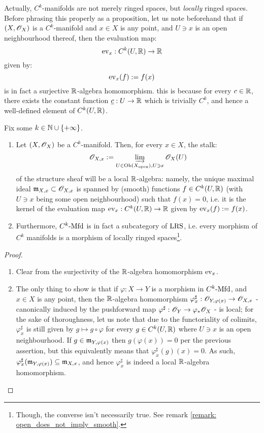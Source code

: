         Actually, $C^k$-manifolds are not merely ringed spaces, but \textit{locally} ringed spaces. Before phrasing this properly as a proposition, let us note beforehand that if $(X, \mathscr{O}_X)$ is a $C^k$-manifold and $x \in X$ is any point, and $U \ni x$ is an open neighbourhood thereof, then the evaluation map:
            $$\mathrm{ev}_x: C^k(U, \mathbb{R}) \to \mathbb{R}$$
        given by:
            $$\mathrm{ev}_x(f) := f(x)$$
        is in fact a surjective $\mathbb{R}$-algebra homomorphism. this is because for every $c \in \mathbb{R}$, there exists the constant function $\underline{c}: U \to \mathbb{R}$ which is trivially $C^k$, and hence a well-defined element of $C^k(U, \mathbb{R})$. 
        \begin{proposition} \label{prop: differentiable_manifolds_are_locally_ringed_spaces}
            Fix some $k \in \mathbb{N} \cup \{+\infty\}$.
            \begin{enumerate}
                \item Let $(X, \mathscr{O}_X)$ be a $C^k$-manifold. Then, for every $x \in X$, the stalk:
                    $$\mathscr{O}_{X, x} := \varinjlim_{U \in \mathrm{Ob}(X_{\mathrm{open}}), U \ni x} \mathscr{O}_X(U)$$
                of the structure sheaf will be a local $\mathbb{R}$-algebra: namely, the unique maximal ideal $\mathfrak{m}_{X, x} \subset \mathscr{O}_{X, x}$ is spanned by (smooth) functions $f \in C^k(U, \mathbb{R})$ (with $U \ni x$ being some open neighbourhood) such that $f(x) = 0$, i.e. it is the kernel of the evaluation map $\mathrm{ev}_x: C^k(U, \mathbb{R}) \to \mathbb{R}$ given by $\mathrm{ev}_x(f) := f(x)$. 
                \item Furthermore, $C^k\text{-}\mathrm{Mfd}$ is in fact a subcategory of $\mathrm{LRS}$, i.e. every morphism of $C^k$ manifolds is a morphism of locally ringed spaces\footnote{Though, the converse isn't necessarily true. See remark \ref{remark: open_does_not_imply_smooth}.}.
            \end{enumerate}
        \end{proposition}
            \begin{proof}
                \begin{enumerate}
                    \item Clear from the surjectivity of the $\mathbb{R}$-algebra homomorphism $\mathrm{ev}_x$.
                    \item The only thing to show is that if $\varphi: X \to Y$ is a morphism in $C^k\text{-}\mathrm{Mfd}$, and $x \in X$ is any point, then the $\mathbb{R}$-algebra homomorphism $\varphi^{\sharp}_x: \mathscr{O}_{Y, \varphi(x)} \to \mathscr{O}_{X, x}$ - canonically induced by the pushforward map $\varphi^{\sharp}: \mathscr{O}_Y \to \varphi_* \mathscr{O}_X$ - is local; for the sake of thoroughness, let us note that due to the functoriality of colimits, $\varphi^{\sharp}_x$ is still given by $g \mapsto g \circ \varphi$ for every $g \in C^k(U, \mathbb{R})$ where $U \ni x$ is an open neighbourhood. If $g \in \mathfrak{m}_{Y, \varphi(x)}$ then $g(\varphi(x)) = 0$ per the previous assertion, but this equivalently means that $\varphi^{\sharp}_x(g)(x) = 0$. As such, $\varphi^{\sharp}_x( \mathfrak{m}_{Y, \varphi(x)}) \subseteq \mathfrak{m}_{X, x}$, and hence $\varphi^{\sharp}_x$ is indeed a local $\mathbb{R}$-algebra homomorphism.
                \end{enumerate}
            \end{proof}

